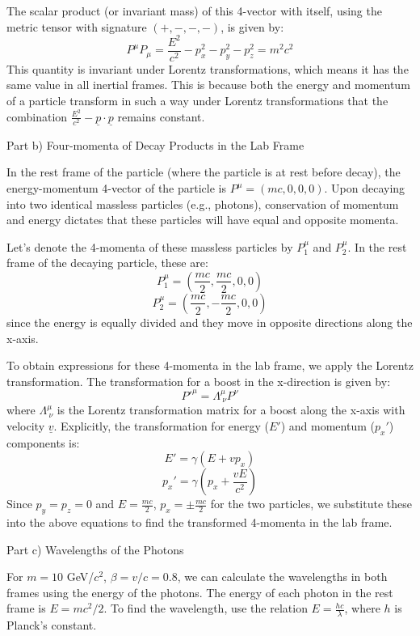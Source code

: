 \documentclass[a4paper,11pt]{article}
\begin{document}
The scalar product (or invariant mass) of this 4-vector with itself, using the metric tensor with signature \((+,-,-,-)\), is given by:
\[ P^\mu P_\mu = \frac{E^2}{c^2} - p_x^2 - p_y^2 - p_z^2 = m^2c^2 \]
This quantity is invariant under Lorentz transformations, which means it has the same value in all inertial frames. This is because both the energy and momentum of a particle transform in such a way under Lorentz transformations that the combination \( \frac{E^2}{c^2} - \underline{p} \cdot \underline{p} \) remains constant.

Part b) Four-momenta of Decay Products in the Lab Frame

In the rest frame of the particle (where the particle is at rest before decay), the energy-momentum 4-vector of the particle is \( P^\mu = (mc, 0, 0, 0) \). Upon decaying into two identical massless particles (e.g., photons), conservation of momentum and energy dictates that these particles will have equal and opposite momenta.

Let's denote the 4-momenta of these massless particles by \( P_1^\mu \) and \( P_2^\mu \). In the rest frame of the decaying particle, these are:
\[ P_1^\mu = \left(\frac{mc}{2}, \frac{mc}{2}, 0, 0\right) \]
\[ P_2^\mu = \left(\frac{mc}{2}, -\frac{mc}{2}, 0, 0\right) \]
since the energy is equally divided and they move in opposite directions along the x-axis.

To obtain expressions for these 4-momenta in the lab frame, we apply the Lorentz transformation. The transformation for a boost in the x-direction is given by:
\[ P'^\mu = \Lambda^\mu_{\ \nu} P^\nu \]
where \( \Lambda^\mu_{\ \nu} \) is the Lorentz transformation matrix for a boost along the x-axis with velocity \( \underline{v} \). Explicitly, the transformation for energy (\( E' \)) and momentum (\( p_x' \)) components is:
\[ E' = \gamma(E + v p_x) \]
\[ p_x' = \gamma(p_x + \frac{vE}{c^2}) \]
Since \( p_y = p_z = 0 \) and \( E = \frac{mc}{2} \), \( p_x = \pm \frac{mc}{2} \) for the two particles, we substitute these into the above equations to find the transformed 4-momenta in the lab frame.

Part c) Wavelengths of the Photons

For \( m = 10 \) GeV/\( c^2 \), \( \beta = v/c = 0.8 \), we can calculate the wavelengths in both frames using the energy of the photons. The energy of each photon in the rest frame is \( E = mc^2/2 \). To find the wavelength, use the relation \( E = \frac{hc}{\lambda} \), where \( h \) is Planck's constant.
\end{document}
